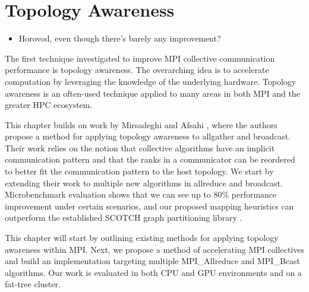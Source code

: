 
\glsresetall %
\chapter[Topology]{Topology Awareness}\label{ch:TopologyAwareness}


\begin{itemize}
    \item Horovod, even though there's barely any improvement?
\end{itemize}

The first technique investigated to improve MPI collective communication performance is topology awareness.
The overarching idea is to accelerate computation by leveraging the knowledge of the underlying hardware.
Topology awareness is an often-used technique applied to many areas in both MPI and the greater HPC ecosystem.

This chapter builds on work by Mirsadeghi and Afsahi \cite{Mirsadeghi2016TopoAwareCollRR}, where the authors propose a method for applying topology awareness to allgather and broadcast.
Their work relies on the notion that collective algorithms have an implicit communication pattern and that the ranks in a communicator can be reordered to better fit the communication pattern to the host topology.
We start by extending their work to multiple new algorithms in allreduce and broadcast.
Microbenchmark evaluation shows that we can see up to 80\% performance improvement under certain scenarios, and our proposed mapping heuristics can outperform the established SCOTCH graph partitioning library \cite{Pellegrini2012SCOTCH}.

This chapter will start by outlining existing methods for applying topology awareness within MPI.
Next, we propose a method of accelerating MPI collectives and build an implementation targeting multiple MPI\_Allreduce and MPI\_Bcast algorithms.
Our work is evaluated in both CPU and GPU environments and on a fat-tree cluster.

